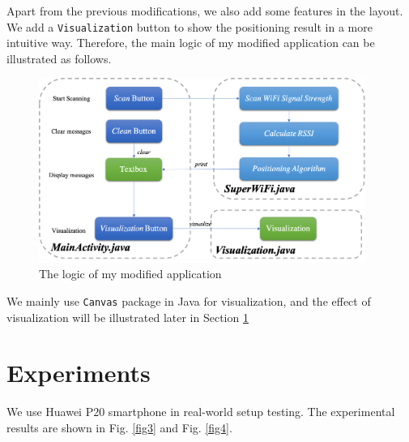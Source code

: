 \documentclass[12pt, a4paper]{article}
\theoremstyle{definition}
\begin{document}
Apart from the previous modifications, we also add some features in the layout. We add a \texttt{Visualization} button to show the positioning result in a more intuitive way. Therefore, the main logic of my modified application can be illustrated as follows. 
\begin{figure}[htbp]
	\centering
	\includegraphics[width=4.2in]{2.png}
	\caption{The logic of my modified application}
	\label{fig2}
\end{figure}

We mainly use \texttt{Canvas} package in Java for visualization, and the effect of visualization will be illustrated later in Section \ref{section4}

\section{Experiments}\label{section4}
We use Huawei P20 smartphone in real-world setup testing. The experimental results are shown in Fig. \ref{fig3} and Fig. \ref{fig4}.
\end{document}
